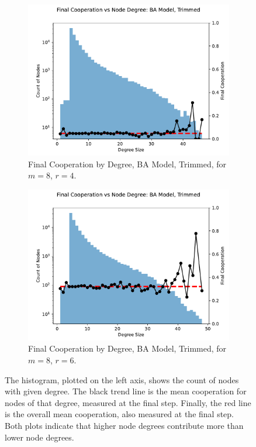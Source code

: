 \FloatBarrier 
\begin{figure}[!h]
  \begin{subfigure}[b]{0.45\textwidth}
    \includegraphics[width=1.1\textwidth]{images/Rep_BA_node_groups_m_8_phi_4_trimmed.pdf}
    \caption{Final Cooperation by Degree, BA Model, Trimmed, for $m=8$, $r=4$.   }
    \label{ID_by_degree_m_8_phi_4}
  \end{subfigure}
  \hfill
  \begin{subfigure}[b]{0.45\textwidth}
    \includegraphics[width=1.1\textwidth]{images/Rep_BA_node_groups_m_8_phi_6_trimmed.pdf}
    \caption{Final Cooperation by Degree, BA Model, Trimmed, for $m=8$, $r=6$. }
    \label{ID_by_degree_m_8_phi_6}
  \end{subfigure}
  \caption{The histogram, plotted on the left axis, shows the count of nodes with given degree. The black trend line is the mean cooperation for nodes of that degree, measured at the final step. Finally, the red line is the overall mean cooperation, also measured at the final step. Both plots indicate that higher node degrees contribute more than lower node degrees.} \label{ID_by_degree_m_8}
\end{figure} 
\FloatBarrier

